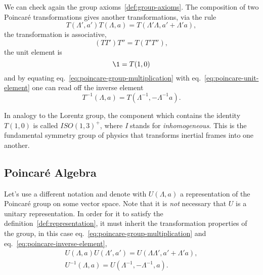 We can check again the group axioms~\ref{def:group-axioms}. The composition of two Poincaré transformations gives another transformations, via the rule
\begin{equation}\label{eq:poincare-group-multiplication}
    T(\Lambda', a') T(\Lambda, a) = T(\Lambda' \Lambda, a' + \Lambda' a),
\end{equation}
the transformation is associative,
\begin{equation}
    (TT')T'' = T(T'T''),
\end{equation}
the unit element is
\begin{equation}\label{eq:poincare-unit-element}
    \1 = T(1,0)
\end{equation}
and by equating eq.~\eqref{eq:poincare-group-multiplication} with eq.~\eqref{eq:poincare-unit-element} one can read off the inverse element
\begin{equation}\label{eq:poincare-inverse-element}
    T^{-1}(\Lambda, a) = T(\Lambda^{-1}, -\Lambda^{-1}a).
\end{equation}

In analogy to the Lorentz group, the component which contains the identity $T(1,0)$ is called $ISO(1,3)^+$, where \emph{I} stands for \emph{inhomogeneous}. This is the fundamental symmetry group of physics that transforms inertial frames into one another.



\subsection{Poincaré Algebra}
Let's use a different notation and denote with $U(\Lambda, a)$ a representation of the Poincaré group on some vector space. Note that it is \emph{not} necessary that $U$ is a unitary representation. In order for it to satisfy the definition~\ref{def:representation}, it must inherit the transformation properties of the group, in this case eq.~\eqref{eq:poincare-group-multiplication} and eq.~\eqref{eq:poincare-inverse-element},
\begin{subequations}
\begin{gather}
    U(\Lambda, a) U(\Lambda',a') = U(\Lambda\Lambda', a' + \Lambda' a) , \label{eq:representation-poincare-group-multiplication} \\
    U^{-1} (\Lambda, a) = U(\Lambda^{-1},-\Lambda^{-1},a) . \label{eq:representation-poincare-inverse-element}
\end{gather}
\end{subequations}


